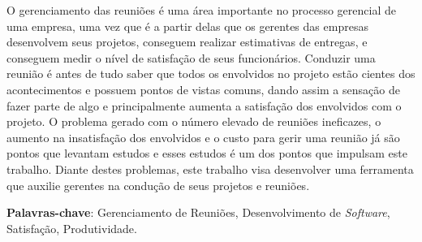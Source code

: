\begin{resumo}

 O gerenciamento das reuniões é uma área importante no processo gerencial de uma empresa, uma vez que é a partir delas que os gerentes das empresas desenvolvem seus projetos, conseguem realizar estimativas de entregas, e conseguem medir o nível de satisfação de seus funcionários. Conduzir uma reunião é antes de tudo saber que todos os envolvidos no projeto estão cientes dos acontecimentos e possuem pontos de vistas comuns, dando assim a sensação de fazer parte de algo e principalmente aumenta a satisfação dos envolvidos com o projeto. O problema gerado com o número elevado de reuniões ineficazes, o aumento na insatisfação dos envolvidos e o custo para gerir uma reunião já são pontos que levantam estudos e esses estudos é um dos pontos que impulsam este trabalho. Diante destes problemas, este trabalho visa desenvolver uma ferramenta que auxilie gerentes na condução de seus projetos e reuniões. 

 \vspace{\onelineskip}

 \noindent
 \textbf{Palavras-chave}: Gerenciamento de Reuniões, Desenvolvimento de \textit{Software}, Satisfação, Produtividade.
\end{resumo}
